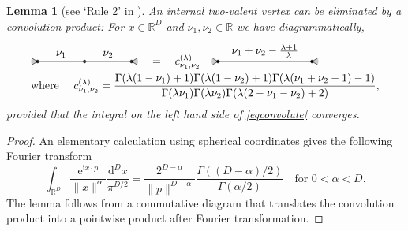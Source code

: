 \documentclass[oneside]{amsart}
\newcommand{\RR}{{\mathbb R}}
\newcommand{\ee}{\mathrm{e}}
\newcommand{\ii}{\mathrm{i}}
\newcommand{\dd}{\mathrm{d}}
\theoremstyle{plain}
\newtheorem{lem}[thm]{Lemma}
\begin{document}
\begin{lem}[see `Rule 2' in \cite{K2}]\label{lemconv}
An internal two-valent vertex can be eliminated by a convolution product:
For $x\in\RR^D$ and $\nu_1,\nu_2\in\RR$ we have diagrammatically,
\begin{align}\label{eqconvolute}
&\begin{tikzpicture}[baseline={([yshift=-2.5ex]current bounding box.center)}]
    \coordinate (v1) at (0,0);
    \coordinate (v2) at (1.5,0);
    \coordinate (v3) at (3,0);
%
    \filldraw[black!20] (v1) -- ([shift=(150:.2)]v1) arc (150:210:.2) -- (v1);
    \draw (v1) -- ([shift=(150:.2)]v1);
    \draw (v1) -- ([shift=(210:.2)]v1);
%
    \filldraw[black!20] (v3) -- ([shift=(30:.2)]v3) arc (30:-30:.2) -- (v3);
    \draw (v3) -- ([shift=(30:.2)]v3);
    \draw (v3) -- ([shift=(-30:.2)]v3);
%
    \filldraw (v1) circle (1.3pt);
    \filldraw (v2) circle (1.3pt);
    \filldraw (v3) circle (1.3pt);
%
    \draw[white] (v1) -- node[above] {$\phantom{\nu_1+\nu_2-\frac{\lambda+1}{\lambda}}$} (v3);
    \draw (v1) -- node[above] {$\nu_1$} (v2);
    \draw (v2) -- node[above] {$\nu_2$} (v3);
\end{tikzpicture}
\quad
=
\quad
c^{(\lambda)}_{\nu_1,\nu_2}
\quad
\begin{tikzpicture}[baseline={([yshift=-2.5ex]current bounding box.center)}]
    \coordinate (v1) at (0,0);
    \coordinate (v3) at (3,0);
%
    \filldraw[black!20] (v1) -- ([shift=(150:.2)]v1) arc (150:210:.2) -- (v1);
    \draw (v1) -- ([shift=(150:.2)]v1);
    \draw (v1) -- ([shift=(210:.2)]v1);
%
    \filldraw[black!20] (v3) -- ([shift=(30:.2)]v3) arc (30:-30:.2) -- (v3);
    \draw (v3) -- ([shift=(30:.2)]v3);
    \draw (v3) -- ([shift=(-30:.2)]v3);
%
    \filldraw (v1) circle (1.3pt);
    \filldraw (v3) circle (1.3pt);
%
    \draw (v1) -- node[above] {$\nu_1+\nu_2-\frac{\lambda+1}{\lambda}$} (v3);
\end{tikzpicture}\\
&\text{where } \quad
c^{(\lambda)}_{\nu_1,\nu_2} = \frac{\Gamma(\lambda(1-\nu_1)+1)\Gamma(\lambda(1-\nu_2)+1)\Gamma(\lambda(\nu_1+\nu_2-1)-1)}
{\Gamma(\lambda\nu_1)\Gamma(\lambda\nu_2)\Gamma(\lambda(2-\nu_1-\nu_2)+2)},\nonumber
\end{align}
provided that the integral on the left hand side of \eqref{eqconvolute} converges.
\end{lem}
\begin{proof}
An elementary calculation using spherical coordinates gives the following Fourier transform
\begin{equation}\label{eqfourier}
\int_{\RR^D}\frac{\ee^{\ii x\cdot p}}{\|x\|^\alpha}\frac{\dd^Dx}{\pi^{D/2}}=\frac{2^{D-\alpha}}{\|p\|^{D-\alpha}}\frac{\Gamma((D-\alpha)/2)}{\Gamma(\alpha/2)}
\quad\text{for }0<\alpha<D.
\end{equation}
The lemma follows from a commutative diagram that translates the convolution product into a pointwise product after Fourier transformation.
\end{proof}
\end{document}
